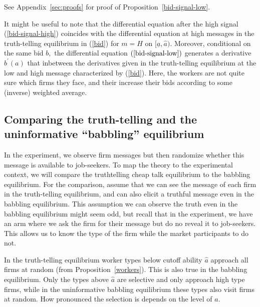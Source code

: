 \documentclass[12pt]{article}
\begin{document}
See Appendix~\ref{sec:proofs} for proof of Proposition~\ref{bid-signal-low}.

\bigskip 

It might be useful to note that the differential equation after the high signal (\ref{bid-signal-high}) coincides with the differential equation at high messages in the truth-telling equilibrium in (\ref{bid}) for $m=H$ on $[\underline{a},\hat{a})$.
  Moreover, conditional on the same bid $b,$ the differential equation $(\ref{bid-signal-low})$ generates a derivative $b^{\prime }(a)$ that inbetween the derivatives given in the truth-telling equilibrium at the low and high message characterized by (\ref{bid}).
  Here, the workers are not quite sure which firms they face, and their increase their bids according to some (inverse) weighted average. 

  \subsection{Comparing the truth-telling and the uninformative ``babbling'' equilibrium}
  In the experiment, we observe firm messages but then randomize whether this message is available to job-seekers.
  To map the theory to the experimental context, we will compare the truthtelling cheap talk equilibrium to the babbling equilibrium.  
  For the comparison, assume that we can see the message of each firm in the truth-telling equilibrium, and can also elicit a truthful message even in the babbling equilibrium.
  This assumption we can observe the truth even in the babbling equilibrium might seem odd, but recall that in the experiment, we have an arm where we ask the firm for their message but do no reveal it to job-seekers.  
  This allows us to know the type of the firm while the market participants to do not.
 
  In the truth-telling equilibrium worker types below cutoff ability $\hat{a}$ approach all firms at random (from Proposition~\ref{workers}).
  This is also true in the babbling equilibrium.
  Only the types above $\hat{a}$ are selective and only approach high type firms, while in the uninformative babbling equilibrium these types also visit firms at random.
  How pronounced the selection is depends on the level of $\hat{a}.$
\end{document}
